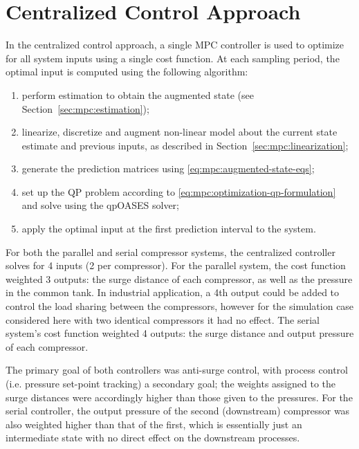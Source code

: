 \section{Centralized Control Approach}
\label{sec:mpc:centralized}

In the centralized control approach, a single MPC controller is used to optimize for all system inputs using a single cost function. At each sampling period, the optimal input is computed using the following algorithm:

\begin{enumerate}
  \item perform estimation to obtain the augmented state (see Section~\ref{sec:mpc:estimation});
  \item linearize, discretize and augment non-linear model about the current state estimate and previous inputs, as described in Section~\ref{sec:mpc:linearization};
  \item generate the prediction matrices using \eqref{eq:mpc:augmented-state-eqs};
  \item set up the QP problem according to \eqref{eq:mpc:optimization-qp-formulation} and solve using the qpOASES solver;
  \item apply the optimal input at the first prediction interval to the system.
\end{enumerate}

For both the parallel and serial compressor systems, the centralized controller solves for 4 inputs (2 per compressor). 
For the parallel system, the cost function weighted 3 outputs: the surge distance of each compressor, as well as the pressure in the common tank.
In industrial application, a 4th output could be added to control the load sharing between the compressors, however for the simulation case considered here with two identical compressors it had no effect. 
The serial system's cost function weighted 4 outputs: the surge distance and output pressure of each compressor.

The primary goal of both controllers was anti-surge control, with process control (i.e. pressure set-point tracking) a secondary goal; the weights assigned to the surge distances were accordingly higher than those given to the pressures.
For the serial controller, the output pressure of the second (downstream) compressor was also weighted higher than that of the first, which is essentially just an intermediate state with no direct effect on the downstream processes.

